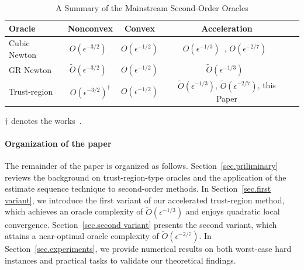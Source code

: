 \documentclass{article}
\begin{document}
\begin{table}[t]
    \caption{A Summary of the Mainstream Second-Order Oracles}
    \label{table.summary}
    \vskip 0.15in
    \begin{center}
        \begin{small}
            \begin{sc}
                \begin{tabular}{lcccr}
                    \toprule
                    Oracle         & Nonconvex                 & Convex                                                  & Acceleration                     \\
                    \midrule
                    Cubic Newton      & $O(\epsilon^{-3/2})$~\cite{nesterov2006cubic} & $O(\epsilon^{-1/2})$\cite{nesterov2006cubic}                               & $O(\epsilon^{-1/3})$~\cite{nesterov2008accelerating}, $O(\epsilon^{-2/7})$~\cite{carmon2022optimal} \\
                    GR Newton & $\tilde{O} (\epsilon^{-3/2})$~\cite{gratton2023yet}    & $O(\epsilon^{-1/2})$\cite{mishchenko_regularized_2023}                     & $\tilde O(\epsilon^{-1/3})$~\cite{doikov2020contracting}    \\
                    Trust-region      & $O(\epsilon^{-3/2})^\dagger$                 & $O(\epsilon^{-1/2})$\cite{jiang2024nonconvexityuniversaltrustregionmethod} & $\tilde O(\epsilon^{-1/3})$, $\tilde O(\epsilon^{-2/7})$, this Paper                       \\
                    \bottomrule
                \end{tabular}
            \end{sc}
        \end{small}
    \end{center}
    \vskip -0.1in
    \begin{tablenotes}
        \small
        \item $\dagger$ denotes the works~\cite{curtis2017trust,curtis2021trust,luenberger_linear_2021,hamad2022consistently,hamad2024simplepracticaladaptivetrustregion,jiang2024nonconvexityuniversaltrustregionmethod}.
    \end{tablenotes}
\end{table}


\paragraph{Organization of the paper}
The remainder of the paper is organized as follows. Section~\ref{sec.priliminary} reviews the background on trust-region-type oracles and the application of the estimate sequence technique to second-order methods. In Section~\ref{sec.first variant}, we introduce the first variant of our accelerated trust-region method, which achieves an oracle complexity of $\tilde O(\epsilon^{-1/3})$ and enjoys quadratic local convergence. Section~\ref{sec.second variant} presents the second variant, which attains a near-optimal oracle complexity of $\tilde O(\epsilon^{-2/7})$. In Section~\ref{sec.experiments}, we provide numerical results on both worst-case hard instances and practical tasks to validate our theoretical findings.
\end{document}

